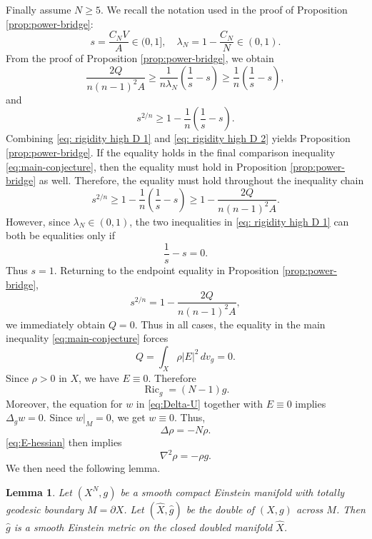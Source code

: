 \documentclass[11pt,letterpaper]{amsart}
\newtheorem{lemma}[theorem]{Lemma}
\theoremstyle{definition}
\theoremstyle{remark}
\numberwithin{equation}{section}
\newcommand{\Ric}{\operatorname{Ric}}
\begin{document}
Finally assume $N\ge5$. We recall the notation used in the proof of Proposition \ref{prop:power-bridge}:
\[
s=\frac{C_N V}{A} \in(0,1], \quad \lambda_N=1-\frac{C_N}{N} \in(0,1).
\]
From the proof of Proposition \ref{prop:power-bridge}, we obtain 
\begin{equation}\label{eq: rigidity high D 1}
\frac{2 Q}{n(n-1)^2 A} \geq \frac{1}{n \lambda_N}\left(\frac{1}{s}-s\right) \geq \frac{1}{n}\left(\frac{1}{s}-s\right),
\end{equation}
and 
\begin{equation}\label{eq: rigidity high D 2}
s^{2 / n} \geq 1-\frac{1}{n}\left(\frac{1}{s}-s\right).
\end{equation}
Combining \eqref{eq: rigidity high D 1} and \eqref{eq: rigidity high D 2} yields Proposition \ref{prop:power-bridge}. If the equality holds in the final comparison inequality \eqref{eq:main-conjecture}, then the equality must hold in Proposition \ref{prop:power-bridge} as well. Therefore, the equality must hold throughout the inequality chain
\[
s^{2 / n} \geq 1-\frac{1}{n}\left(\frac{1}{s}-s\right) \geq 1-\frac{2 Q}{n(n-1)^2 A}.
\]
However, since $\lambda_N \in (0,1)$, the two inequalities in \eqref{eq: rigidity high D 1} can both be equalities only if
\[
\frac{1}{s}-s=0.
\]
Thus $s=1$. Returning to the endpoint equality in Proposition
\ref{prop:power-bridge},
\[
  s^{2/n}
  =
  1-\frac{2Q}{n(n-1)^2A},
\]
we immediately obtain \(Q=0\).
Thus in all cases, the equality in the main inequality \eqref{eq:main-conjecture} forces 
\[
 Q=\int_X\rho |E|^2\,dv_g=0.
\]
Since $\rho>0$ in $X$, we have $E\equiv0$.  Therefore
\[
 \Ric_g=(N-1)g.
\]
Moreover, the equation for $w$ in \eqref{eq:Delta-U}  together with $E\equiv0$ implies $\Delta_g w=0$. Since $w|_M=0$,  we get $w\equiv0$. Thus,
\[
 \Delta\rho=-N\rho.
\]
\eqref{eq:E-hessian} then implies
\begin{equation}\label{eq:Obata}
\nabla^2\rho=-\rho g.
\end{equation}
We then need the following lemma.
\begin{lemma}\label{lem: reflection lemma}
Let $\left(X^N, g\right)$ be a smooth compact Einstein manifold with totally geodesic boundary $M= \partial X$. Let $(\hat{X}, \hat{g})$ be the double of $(X, g)$ across $M$. Then $\hat{g}$ is a smooth Einstein metric on the closed doubled manifold $\hat{X}$. 
\end{lemma}
\end{document}

